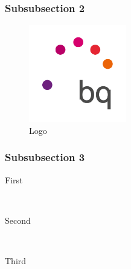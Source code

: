 \documentclass[12pt]{article} %
\begin{document}
\lipsum[6] %


\subsubsection{Subsubsection 2} %

\lipsum[6] %
\begin{figure} %
  \begin{center}
    \includegraphics[width=0.38\textwidth]{logo}
  \end{center}
  \caption{Logo}
\end{figure}
\lipsum[7-8] %


\subsubsection{Subsubsection 3} %

\begin{description} %

\item[First] \hfill \\
\lipsum[9] %

\item[Second] \hfill \\
\lipsum[10] %

\item[Third] \hfill \\
\lipsum[11] %

\end{description} 

\end{document}
